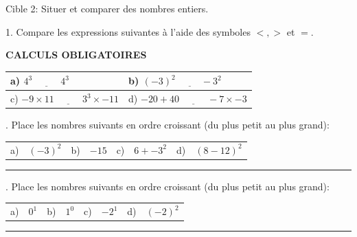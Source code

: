\documentclass[11pt]{article}
\begin{document}
\begin{cible}{Cible 2: Situer et comparer des nombres entiers.}

1. Compare les expressions suivantes à l'aide des symboles $<, >$ et $=$. 

\vspace{1cm}

\textbf{CALCULS OBLIGATOIRES}

\vspace{1cm}

\begin{tabular}{|p{7.7cm}|p{7.7cm}|}
\hline
\rule{0pt}{4mm} a) $4^3 \; \underline{\hspace{1cm}} \; 4^3$                     &               b) $(-3)^2  \; \underline{\hspace{1cm}} -3^2\; $           \\[3.2cm]
\hline
\rule{0pt}{4mm} c) $-9 \times 11 \; \underline{\hspace{1cm}} \; 3^3 \times -11$ &               d) $-20 + 40 \; \underline{\hspace{1cm}} \; -7 \times -3$ \\[3.2cm]
\hline
\end{tabular}



\vspace{6mm}
. Place les nombres  suivants en ordre croissant (du plus petit au plus grand): 

\vspace{2mm}
\begin{tabular}{@{}p{0.5cm}p{3cm}p{0.5cm}p{3.5cm}p{0.5cm}p{3cm}p{0.5cm}p{3cm}@{}}
a) & $(-3)^2$ & b) & $-15$ & c) & $6 + -3^2$ & d) & $(8-12)^2$ \\
\end{tabular}

\vspace{1cm} 

\noindent\rule{15cm}{0.4pt}

\vspace{6mm}
. Place les nombres  suivants en ordre croissant (du plus petit au plus grand): 

\vspace{2mm}
\begin{tabular}{@{}p{0.5cm}p{3cm}p{0.5cm}p{3.5cm}p{0.5cm}p{3cm}p{0.5cm}p{3cm}@{}}
a) & $0^1$ & b) & $1^0$ & c) & $-2^1$ & d) & $(-2)^2$ \\
\end{tabular}

\vspace{1cm}

\noindent\rule{15cm}{0.4pt}

\end{cible}
\end{document}
